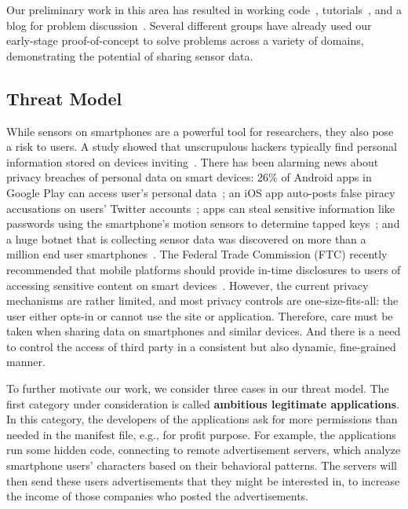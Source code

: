 Our preliminary work in this area has resulted in working 
code~\cite{seattle-sensor-git}, tutorials~\cite{seattle-sensor-project}, and a 
blog for problem discussion~\cite{sensor}. Several different groups have
already used our early-stage proof-of-concept to solve problems across a variety
of domains, demonstrating the potential of sharing sensor data. 

\subsection{\blurname Threat Model}\label{sec-threat}

While sensors on smartphones are a powerful tool for researchers, they also pose
a risk to users. A study showed that unscrupulous hackers typically find
personal information stored on devices inviting~\cite{mulligan2000your}. There
has been alarming news about privacy breaches of personal data on smart devices:
26\% of Android apps in Google Play can access user's personal
data~\cite{toomuch}; an iOS app auto-posts false piracy accusations on users'
Twitter accounts~\cite{tweetios}; apps can steal sensitive information like
passwords using the smartphone's motion sensors to determine tapped
keys~\cite{xu2012taplogger}; and a huge botnet that is collecting sensor data
was discovered on more than a million end user smartphones~\cite{botnet}. The
Federal Trade Commission (FTC) recently recommended that mobile platforms should
provide in-time disclosures to users of accessing sensitive content on smart
devices~\cite{ftc}. However, the current privacy mechanisms are rather limited,
and most privacy controls are one-size-fits-all: the user either opts-in or
cannot use the site or application. Therefore, care must be taken when sharing
data on smartphones and similar devices. And there is a need to control the
access of third party in a consistent but also dynamic, fine-grained manner.

To further motivate our work, we consider three cases in our threat model. The
first category under consideration is called \textbf{ambitious legitimate
applications}. In this category, the developers of the applications ask for more
permissions than needed in the manifest file, e.g., for profit purpose. For
example, the applications run some hidden code, connecting to remote
advertisement servers, which analyze smartphone users' characters based on their
behavioral patterns. The servers will then send these users advertisements
that they might be interested in, to increase the income of those companies who
posted the advertisements.

